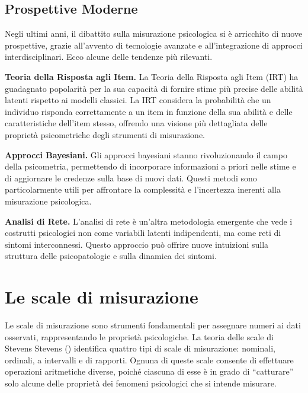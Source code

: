 \documentclass[
  letterpaper,
  DIV=11,
  numbers=noendperiod]{scrreprt}
\theoremstyle{definition}
\theoremstyle{remark}
\begin{document}
\subsection{Prospettive Moderne}\label{prospettive-moderne}

Negli ultimi anni, il dibattito sulla misurazione psicologica si è
arricchito di nuove prospettive, grazie all'avvento di tecnologie
avanzate e all'integrazione di approcci interdisciplinari. Ecco alcune
delle tendenze più rilevanti.

\textbf{Teoria della Risposta agli Item.} La Teoria della Risposta agli
Item (IRT) ha guadagnato popolarità per la sua capacità di fornire stime
più precise delle abilità latenti rispetto ai modelli classici. La IRT
considera la probabilità che un individuo risponda correttamente a un
item in funzione della sua abilità e delle caratteristiche dell'item
stesso, offrendo una visione più dettagliata delle proprietà
psicometriche degli strumenti di misurazione.

\textbf{Approcci Bayesiani.} Gli approcci bayesiani stanno
rivoluzionando il campo della psicometria, permettendo di incorporare
informazioni a priori nelle stime e di aggiornare le credenze sulla base
di nuovi dati. Questi metodi sono particolarmente utili per affrontare
la complessità e l'incertezza inerenti alla misurazione psicologica.

\textbf{Analisi di Rete.} L'analisi di rete è un'altra metodologia
emergente che vede i costrutti psicologici non come variabili latenti
indipendenti, ma come reti di sintomi interconnessi. Questo approccio
può offrire nuove intuizioni sulla struttura delle psicopatologie e
sulla dinamica dei sintomi.

\section{Le scale di misurazione}\label{le-scale-di-misurazione}

Le scale di misurazione sono strumenti fondamentali per assegnare numeri
ai dati osservati, rappresentando le proprietà psicologiche. La teoria
delle scale di Stevens Stevens ()
identifica quattro tipi di scale di misurazione: nominali, ordinali, a
intervalli e di rapporti. Ognuna di queste scale consente di effettuare
operazioni aritmetiche diverse, poiché ciascuna di esse è in grado di
``catturare'' solo alcune delle proprietà dei fenomeni psicologici che
si intende misurare.
\end{document}
